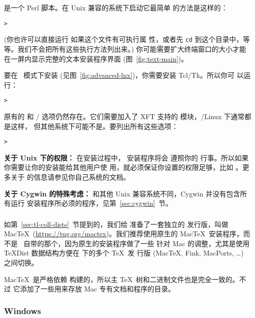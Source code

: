 \documentclass{article}
\begin{document}
 是一个 Perl 脚本。在 Unix 兼容的系统下启动它最简单
的方法是这样的：

\begin{alltt}
  > 
\end{alltt}
(你也许可以直接运行  如果这个文件有可执行属
性，或者先 \texttt{cd} 到这个目录中，等等。我们不会把所有这些执行方法列出来。)
你可能需要扩大终端窗口的大小才能在一屏内显示完整的文本安装程序界面
(图~\ref{fig:text-main})。

要在 \GUI\ 模式下安装 (见图~\ref{fig:advanced-lnx})，你需要安装 Tcl/Tk。所以你可
以运行：
\begin{alltt}
  > 
\end{alltt}

原有的  和 / 选项仍然存在。它们需要加入了
XFT 支持的  模块，\GNU/Linux 下通常都是这样，
但其他系统下可能不是。要列出所有这些选项：
\begin{alltt}
  > 
\end{alltt}

\textbf{关于 Unix 下的权限：} 在安装过程中，\TL{} 安装程序将会
遵照你的  行事。所以如果你需要让你的安装能给其他用户使
用，就必须保证你设置的权限足够，比如 。更多关于
 的信息请参见你自己系统的文档。

\textbf{关于 Cygwin 的特殊考虑：} 和其他 Unix 兼容系统不同，Cygwin
并没有包含所有运行 \TL{} 安装程序所必须的程序，见第~\ref{sec:cygwin}~节。

\subsubsection{\MacOSX}
\label{sec:macosx}

如第~\ref{sec:tl-coll-dists}~节提到的，我们给 \MacOSX 准备了一套独立的
发行版，叫做 Mac\TeX\ (\url{https://tug.org/mactex})。我们推荐使用原生的
Mac\TeX\ 安装程序，而不是 \TL\ 自带的那个，因为原生的安装程序做了一些
针对 Mac 的调整，尤其是使用 \TeX{}Dist 数据结构方便在 \MacOSX 下的多个 \TeX\ 发
行版 (Mac\TeX, Fink, MacPorts, \ldots) 之间切换。

Mac\TeX\ 是严格依赖 \TL 构建的，所以主 \TeX\ 树和二进制文件也是完全一致的。不过
它添加了一些用来存放 Mac 专有文档和程序的目录。

\subsubsection{Windows}\label{sec:wininst}
\end{document}
